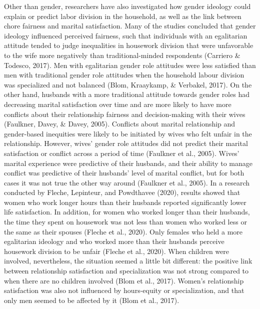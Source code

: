 \documentclass[
  english,
  man]{apa6}
\begin{document}
Other than gender, researchers have also investigated how gender ideology could explain or predict labor division in the household, as well as the link between chore fairness and marital satisfaction. Many of the studies concluded that gender ideology influenced perceived fairness, such that individuals with an egalitarian attitude tended to judge inequalities in housework division that were unfavorable to the wife more negatively than traditional-minded respondents (Carriero \& Todesco, 2017). Men with egalitarian gender role attitudes were less satisfied than men with traditional gender role attitudes when the household labour division was specialized and not balanced (Blom, Kraaykamp, \& Verbakel, 2017). On the other hand, husbands with a more traditional attitude towards gender roles had decreasing marital satisfaction over time and are more likely to have more conflicts about their relationship fairness and decision-making with their wives (Faulkner, Davey, \& Davey, 2005). Conflicts about marital relationship and gender-based inequities were likely to be initiated by wives who felt unfair in the relationship. However, wives' gender role attitudes did not predict their marital satisfaction or conflict across a period of time (Faulkner et al., 2005). Wives' marital experience were predictive of their husbands, and their ability to manage conflict was predictive of their husbands' level of marital conflict, but for both cases it was not true the other way around (Faulkner et al., 2005). In a research conducted by Fleche, Lepinteur, and Powdthavee (2020), results showed that women who work longer hours than their husbands reported significantly lower life satisfaction. In addition, for women who worked longer than their husbands, the time they spent on housework was not less than women who worked less or the same as their spouses (Fleche et al., 2020). Only females who held a more egalitarian ideology and who worked more than their husbands perceive housework division to be unfair (Fleche et al., 2020). When children were involved, nevertheless, the situation seemed a little bit different: the positive link between relationship satisfaction and specialization was not strong compared to when there are no children involved (Blom et al., 2017). Women's relationship satisfaction was also not influenced by hours-equity or specialization, and that only men seemed to be affected by it (Blom et al., 2017).
\end{document}
